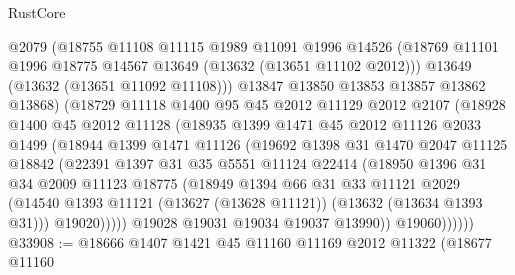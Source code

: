 \begin{lexlean}{RustCore}
\begin{coremodule}
                @2079
                (@18755
                  @11108
                  @11115
                  @1989
                  @11091
                  @1996
                  @14526
                  (@18769 @11101 @1996 @18775 @14567 @13649 (@13632 (@13651 @11102 @2012)))
                  @13649
                  (@13632 (@13651 @11092 @11108)))
                @13847
                @13850
                @13853
                @13857
                @13862
                @13868)
              (@18729
                @11118
                @1400
                @95
                @45
                @2012
                @11129
                @2012
                @2107
                (@18928
                  @1400
                  @45
                  @2012
                  @11128
                  (@18935
                    @1399
                    @1471
                    @45
                    @2012
                    @11126
                    @2033
                    @1499
                    (@18944
                      @1399
                      @1471
                      @11126
                      (@19692
                        @1398
                        @31
                        @1470
                        @2047
                        @11125
                        @18842
                        (@22391
                          @1397
                          @31
                          @35
                          @5551
                          @11124
                          @22414
                          (@18950
                            @1396
                            @31
                            @34
                            @2009
                            @11123
                            @18775
                            (@18949
                              @1394
                              @66
                              @31
                              @33
                              @11121
                              @2029
                              (@14540
                                @1393
                                @11121
                                (@13627 (@13628 @11121))
                                (@13632 (@13634 @1393 @31)))
                              @19020)))))
                    @19028
                    @19031
                    @19034
                    @19037
                    @13990))
                @19060))))))
@33908 := @18666
    @1407
    @1421
    @45
    @11160
    @11169
    @2012
    @11322
    (@18677
      @11160

\end{coremodule}
\end{lexlean}
